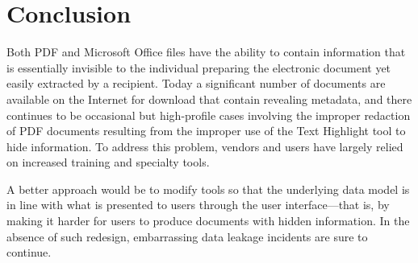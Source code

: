 
\section{Conclusion}

Both PDF and Microsoft Office files have the ability to contain
information that is essentially invisible to the individual preparing
the electronic document yet easily extracted by a recipient. Today a
significant number of documents are available on the Internet for
download that contain revealing metadata, and there continues to be
occasional but high-profile cases involving the improper redaction of
PDF documents resulting from the improper use of the Text Highlight
tool to hide information. To address this problem, vendors and users
have largely relied on increased training and specialty tools. 

A better approach would be to modify tools so that the underlying data
model is in line with what is presented to users through the user
interface---that is, by making it harder for users to produce
documents with hidden information. In the absence of such redesign,
embarrassing data leakage incidents are sure to continue.


